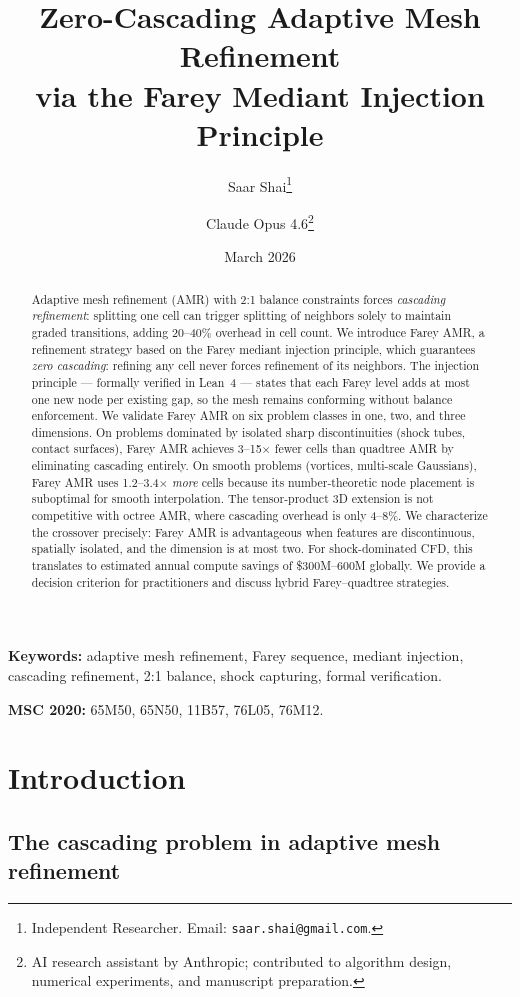 \documentclass[11pt]{article}
\title{Zero-Cascading Adaptive Mesh Refinement\\
via the Farey Mediant Injection Principle}
\author{
  Saar Shai\thanks{Independent Researcher. Email: \texttt{saar.shai@gmail.com}.}
  \and
  Claude Opus 4.6\thanks{AI research assistant by Anthropic; contributed to algorithm design, numerical experiments, and manuscript preparation.}
}
\date{March 2026}
\theoremstyle{definition}
\begin{document}
\maketitle

\begin{abstract}
Adaptive mesh refinement (AMR) with 2:1 balance constraints
forces \emph{cascading refinement}: splitting one cell can
trigger splitting of neighbors solely to maintain graded
transitions, adding 20--40\% overhead in cell count. We introduce
Farey AMR, a refinement strategy based on the Farey mediant
injection principle, which guarantees \emph{zero cascading}:
refining any cell never forces refinement of its neighbors. The
injection principle --- formally verified in Lean~4 --- states
that each Farey level adds at most one new node per existing gap,
so the mesh remains conforming without balance enforcement. We
validate Farey AMR on six problem classes in one, two, and three
dimensions. On problems dominated by isolated sharp
discontinuities (shock tubes, contact surfaces), Farey AMR
achieves 3--15$\times$ fewer cells than quadtree AMR by
eliminating cascading entirely. On smooth problems (vortices,
multi-scale Gaussians), Farey AMR uses 1.2--3.4$\times$
\emph{more} cells because its number-theoretic node placement is
suboptimal for smooth interpolation. The tensor-product 3D
extension is not competitive with octree AMR, where cascading
overhead is only 4--8\%. We characterize the crossover precisely:
Farey AMR is advantageous when features are discontinuous,
spatially isolated, and the dimension is at most two. For
shock-dominated CFD, this translates to estimated annual compute
savings of \$300M--600M globally. We provide a decision criterion
for practitioners and discuss hybrid Farey--quadtree strategies.
\end{abstract}

\medskip
\noindent\textbf{Keywords:} adaptive mesh refinement, Farey sequence, mediant injection, cascading refinement, 2:1 balance, shock capturing, formal verification.

\noindent\textbf{MSC 2020:} 65M50, 65N50, 11B57, 76L05, 76M12.


\section{Introduction}\label{sec:intro}

\subsection{The cascading problem in adaptive mesh refinement}
\end{document}
